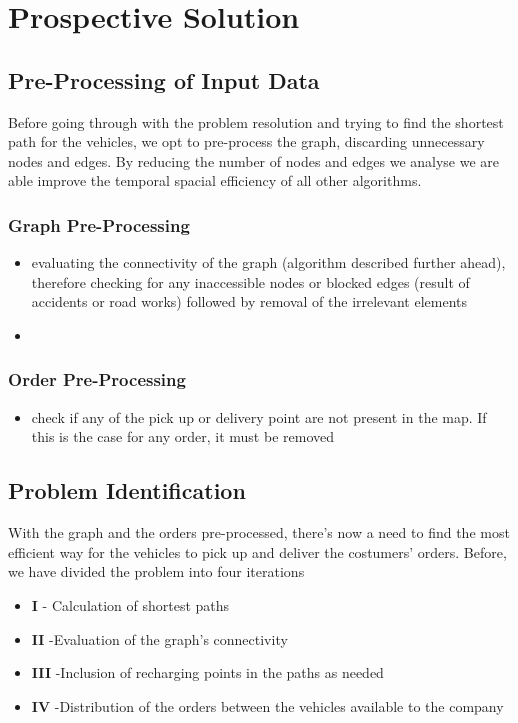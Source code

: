 \chapter{Prospective Solution}

\section{Pre-Processing of Input Data}
Before going through with the problem resolution and trying to find the shortest path for the vehicles, we opt to pre-process the graph, discarding unnecessary nodes and edges. By reducing the number of nodes and edges we analyse we are able improve the temporal spacial efficiency of all other algorithms. 


\subsection{Graph Pre-Processing}
\begin{itemize}
    \item evaluating the connectivity of the graph (algorithm described further ahead), therefore checking for any inaccessible nodes or blocked edges (result of accidents or road works) followed by removal of the irrelevant elements
    \item 
\end{itemize}


\subsection{Order Pre-Processing}
\begin{itemize}
    \item check if any of the pick up or delivery point are not present in the map. If this is the case for any order, it must be removed
\end{itemize}



\section{Problem Identification}

With the graph and the orders pre-processed, there's now a need to find the most efficient way for the vehicles to pick up and deliver the costumers' orders. Before, we have divided the problem into four iterations 
\begin{itemize}
    \item \textbf{I} - Calculation of shortest paths
    \item \textbf{II} -Evaluation of the graph's connectivity
    \item \textbf{III} -Inclusion of recharging points in the paths as needed
    \item \textbf{IV} -Distribution of the orders between the vehicles available to the company
\end{itemize}







